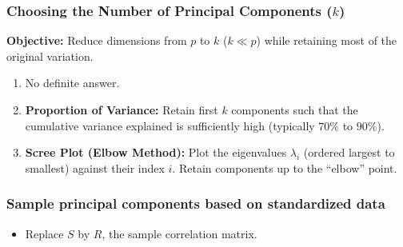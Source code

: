 \documentclass[10pt]{beamer} %
\begin{document}
\begin{frame}
    \frametitle{Choosing the Number of Principal Components ($k$)}
    \textbf{Objective:} Reduce dimensions from $p$ to $k$ ($k \ll p$) while
    retaining most of the original variation. 
    \vspace{0.2cm}
    
    \begin{enumerate}
       \item No definite answer.
        \item \textbf{Proportion of Variance:} Retain first $k$ components such that
           the cumulative variance explained is sufficiently high (typically
           $70\%$ to $90\%$).
        \item \textbf{Scree Plot (Elbow Method):} Plot the eigenvalues
           $\lambda_i$ (ordered largest to smallest) against their index $i$.
           Retain components up to the ``elbow'' point.
    \end{enumerate}
    \vspace{0.2cm}
    
    \begin{center}
    \end{center}
\end{frame}

\begin{frame}
   \frametitle{Sample principal components based on standardized data}
   \begin{itemize}
      \item Replace $S$ by $R$, the sample correlation matrix.
   \end{itemize}
\end{frame}
\end{document}
